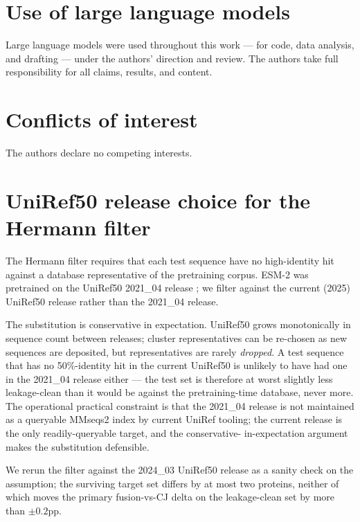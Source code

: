 \documentclass{article}
\begin{document}
\section*{Use of large language models}

Large language models were used throughout this work --- for code,
data analysis, and drafting --- under the authors' direction and review.
The authors take full responsibility for all claims, results, and
content.

\section*{Conflicts of interest}

The authors declare no competing interests.




\appendix
\renewcommand{\thefigure}{A\arabic{figure}}
\renewcommand{\thetable}{A\arabic{table}}
\setcounter{figure}{0}
\setcounter{table}{0}

\section{UniRef50 release choice for the Hermann filter}
\label{app:uniref50}

The Hermann \citep{hermann2024leakage} filter requires that each
test sequence have no high-identity hit against a database
representative of the pretraining corpus. ESM-2 was pretrained on the
UniRef50 2021\_04 release \citep{lin2023esm2}; we filter against the
current (2025) UniRef50 release rather than the 2021\_04 release.

The substitution is conservative in expectation. UniRef50 grows
monotonically in sequence count between releases; cluster
representatives can be re-chosen as new sequences are deposited, but
representatives are rarely \emph{dropped}. A test sequence that has
no 50\%-identity hit in the current UniRef50 is unlikely to have had
one in the 2021\_04 release either --- the test set is therefore at
worst slightly less leakage-clean than it would be against the
pretraining-time database, never more. The operational practical
constraint is that the 2021\_04 release is not maintained as a
queryable MMseqs2 index by current UniRef tooling; the current
release is the only readily-queryable target, and the conservative-
in-expectation argument makes the substitution defensible.

We rerun the filter against the 2024\_03 UniRef50 release as a
sanity check on the assumption; the surviving target set differs
by at most two proteins, neither of which moves the primary
fusion-vs-CJ delta on the leakage-clean set by more than $\pm 0.2$pp.
\end{document}
